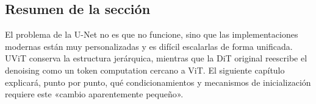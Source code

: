 \subsection{Resumen de la sección}

El problema de la U-Net no es que no funcione, sino que las implementaciones modernas están muy personalizadas y es difícil escalarlas de forma unificada. UViT conserva la estructura jerárquica, mientras que la DiT original reescribe el denoising como un token computation cercano a ViT. El siguiente capítulo explicará, punto por punto, qué condicionamientos y mecanismos de inicialización requiere este «cambio aparentemente pequeño».
